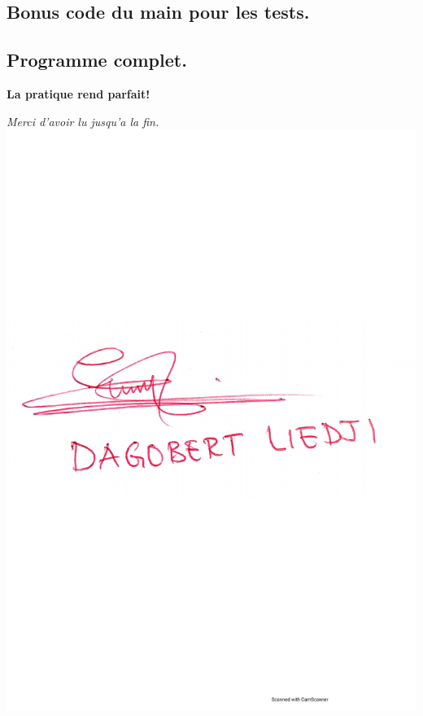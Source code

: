\documentclass{extarticle}
\begin{document}
\subsection*{Bonus code du main pour les tests.}


\newpage
\subsection*{Programme complet.}


\vspace{2cm}
\huge{\textbf{La pratique rend parfait!}}

\textit{Merci d'avoir lu jusqu'a la fin. }\\

\includegraphics[scale=0.3, trim=0.5cm 12cm 2cm 5cm, clip=true]{figs/signed.pdf}
\end{document}
